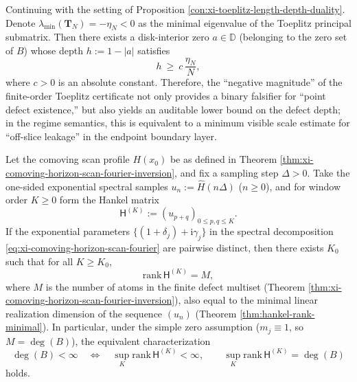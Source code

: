 \begin{proposition}\label{con:xi-toeplitz-negative-eigenvalue-controls-depth}
Continuing with the setting of Proposition \ref{con:xi-toeplitz-length-depth-duality}.
Denote \(\lambda_{\min}(\mathbf{T}_N)=-\eta_N<0\) as the minimal eigenvalue of the Toeplitz principal submatrix.
Then there exists a disk-interior zero \(a\in\mathbb{D}\) (belonging to the zero set of \(B\)) whose depth \(h:=1-|a|\) satisfies
\[
h\ \ge\ c\,\frac{\eta_N}{N},
\]
where \(c>0\) is an absolute constant.
Therefore, the ``negative magnitude'' of the finite-order Toeplitz certificate not only provides a binary falsifier for ``point defect existence,'' but also yields an auditable lower bound on the defect depth; in the regime semantics, this is equivalent to a minimum visible scale estimate for ``off-slice leakage'' in the endpoint boundary layer.
\end{proposition}

\begin{proposition}[Scan Hankel Rank \(=\) Defect Degree: Identification of Tomographic Samples with the Blaschke Index]\label{con:xi-scan-hankel-rank-equals-defect}
Let the comoving scan profile \(H(x_0)\) be as defined in Theorem \ref{thm:xi-comoving-horizon-scan-fourier-inversion}, and fix a sampling step \(\Delta>0\).
Take the one-sided exponential spectral samples \(u_n:=\widehat H(n\Delta)\) (\(n\ge 0\)), and for window order \(K\ge 0\) form the Hankel matrix
\[
\mathsf{H}^{(K)}:=(u_{p+q})_{0\le p,q\le K}.
\]
If the exponential parameters \(\{(1+\delta_j)+\mathrm{i}\gamma_j\}\) in the spectral decomposition \eqref{eq:xi-comoving-horizon-scan-fourier} are pairwise distinct, then there exists \(K_0\) such that for all \(K\ge K_0\),
\[
\mathrm{rank}\,\mathsf{H}^{(K)}=M,
\]
where \(M\) is the number of atoms in the finite defect multiset (Theorem \ref{thm:xi-comoving-horizon-scan-fourier-inversion}), also equal to the minimal linear realization dimension of the sequence \((u_n)\) (Theorem \ref{thm:hankel-rank-minimal}).
In particular, under the simple zero assumption (\(m_j\equiv 1\), so \(M=\deg(B)\)), the equivalent characterization
\[
\deg(B)<\infty\quad\Longleftrightarrow\quad
\sup_{K}\mathrm{rank}\,\mathsf{H}^{(K)}<\infty,
\qquad
\sup_{K}\mathrm{rank}\,\mathsf{H}^{(K)}=\deg(B)
\]
holds.
\end{proposition}

